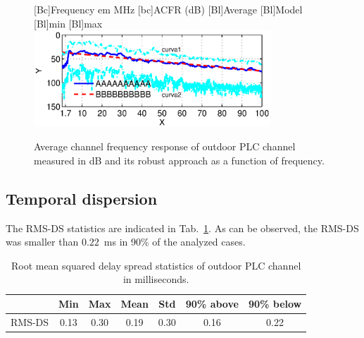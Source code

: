 \documentclass[journal]{IEEEtran}
\newcommand{\tamfig}{3.5in}    %
\begin{document}
	\begin{figure}[!htp]
		\begin{centering}
			[Bc]{Frequency em MHz}    
			[bc]{ACFR (dB)}
			[Bl]{Average}
			[Bl]{Model}
			[Bl]{min}
			[Bl]{max}		
			\includegraphics[width=\tamfig]{Figuras/CFRmedia.eps}
			\caption{Average channel frequency response of outdoor PLC channel measured in dB and its robust approach as a function of frequency.}
			\label{Fig:CFRmedia}
		\end{centering}
	\end{figure}
	
	\subsection{Temporal dispersion}\label{sec-rmsds}
	The \ac{RMS-DS} statistics are indicated in Tab.~\ref{Tab:EstatisticasRMS}. As can be observed, the RMS-DS was smaller than $0.22$~ms in 90\% of the analyzed cases. 
	\begin{table}[!htb]
		\centering
		\caption{Root mean squared delay spread statistics of outdoor PLC channel in milliseconds.}
		\footnotesize  
		\begin{tabular}{c|c|c|c|c|c|c}
			\hline 
			&  Min    & Max    & Mean    & Std    & 90\% above    & 90\% below \\
			\hline 
			RMS-DS     & 0.13   & 0.30  &  0.19    & 0.30   & 0.16          & 0.22 \\
			\hline
		\end{tabular} \label{Tab:EstatisticasRMS}
		\newline
	\end{table}   
	
\end{document}
